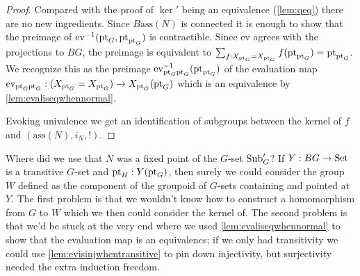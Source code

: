 \begin{proof}

Compared with the proof of $\ker'$ being an equivalence (\cref{lem:qeq}) there are no new ingredients.
Since $B\mathrm{ass}(N)$ is connected it is enough to show that the preimage of $\mathrm{ev}^{-1}(\mathrm{pt}_G,\mathrm{pt}_{\mathrm{pt}_G})$ is contractible.  
Since $\mathrm{ev}$ agrees with the projections to $BG$, the preimage is equivalent to $\sum_{f:X_{\mathrm{pt}_G}=X_{\mathrm{pt}_G}}f(\mathrm{pt}_{\mathrm{pt}_G})=\mathrm{pt}_{\mathrm{pt}_G}$.  We recognize this as the preimage $\mathrm{ev}_{{\mathrm{pt}_G}{\mathrm{pt}_G}}^{-1}(\mathrm{pt}_{\mathrm{pt}_G})$
of the evaluation map 
$\mathrm{ev}_{{\mathrm{pt}_G}{\mathrm{pt}_G}}:(X_{\mathrm{pt}_G}=X_{\mathrm{pt}_G})\to X_{\mathrm{pt}_G}(\mathrm{pt}_G)$ which is an equivalence by \cref{lem:evaliseqwhennormal}.  

Evoking univalence we get an identification of subgroups between the kernel of $f$ and $(\mathrm{ass}(N),i_N,!)$.
\end{proof}


\begin{remark}
  Where did we use that $N$ was a fixed point of the $G$-set $\mathrm{Sub}_G'$?  If $Y:BG\to\mathrm{Set}$ is a transitive $G$-set and $\mathrm{pt}_H:Y(\mathrm{pt}_G)$, then surely we could consider the group $W$ defined as the component of the groupoid of $G$-sets containing and pointed at $Y$.  The first problem is that we wouldn't know how to construct a homomorphism from $G$ to $W$ which we then could consider the kernel of.  The second problem is that we'd be stuck at the very end where we 
used \cref{lem:evaliseqwhennormal} to show that the evaluation map is an equivalencs; if we only had transitivity we could use \cref{lem:evisinjwhentransitive} to pin down injectivity, but surjectivity needed the extra induction freedom. 
\end{remark}

